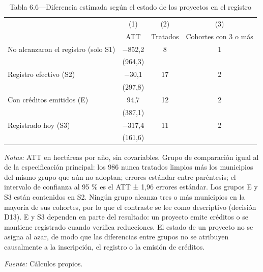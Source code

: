 \begin{table}[htbp]
\centering
\small
\caption{Tabla 6.6—Diferencia estimada según el estado de los proyectos en el registro}
\label{tab:tabla_6_6}
\begin{threeparttable}
\begin{tabular}{@{}lccc@{}}
\toprule
 & (1) & (2) & (3) \\
 & ATT & Tratados & Cohortes con 3 o más \\
\midrule
No alcanzaron el registro (solo S1) & $-$852,2 & 8 & 1 \\
 & (964,3) &  &  \\
Registro efectivo (S2) & $-$30,1 & 17 & 2 \\
 & (297,8) &  &  \\
Con créditos emitidos (E) & 94,7 & 12 & 2 \\
 & (387,1) &  &  \\
Registrado hoy (S3) & $-$317,4 & 11 & 2 \\
 & (161,6) &  &  \\
\bottomrule
\end{tabular}
\begin{tablenotes}[flushleft]
\footnotesize
\item \textit{Notas:} ATT en hectáreas por año, sin covariables. Grupo de comparación igual al de la especificación principal: los 986 nunca tratados limpios más los municipios del mismo grupo que aún no adoptan; errores estándar entre paréntesis; el intervalo de confianza al 95 \% es el ATT ± 1,96 errores estándar. Los grupos E y S3 están contenidos en S2. Ningún grupo alcanza tres o más municipios en la mayoría de sus cohortes, por lo que el contraste se lee como descriptivo (decisión D13). E y S3 dependen en parte del resultado: un proyecto emite créditos o se mantiene registrado cuando verifica reducciones. El estado de un proyecto no se asigna al azar, de modo que las diferencias entre grupos no se atribuyen causalmente a la inscripción, el registro o la emisión de créditos.
\item \textit{Fuente:} Cálculos propios.
\end{tablenotes}
\end{threeparttable}
\end{table}
